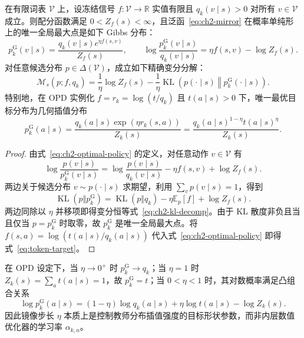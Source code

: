 \documentclass[lang=cn,scheme=chinese,openany]{elegantbook}
\begin{document}
\begin{theorem}
\label{thm:ch2-gibbs}
\label{thm:token-target}
在有限词表 $\mathcal V$ 上，设冻结信号 $f:\mathcal V\to\mathbb R$ 实值有限且 $q_k(v\mid s)>0$ 对所有 $v\in\mathcal V$ 成立。则配分函数满足 $0<Z_f(s)<\infty$，且泛函~\eqref{eq:ch2-mirror} 在概率单纯形上的唯一全局最大点是如下 Gibbs 分布：
\begin{equation}
\label{eq:ch2-optimal-policy}
 p_k^{\mathrm G}(v\mid s)=\frac{ q_k(v\mid s)e^{\eta f(s,v)}}{Z_f(s)},
\qquad
\log\frac{ p_k^{\mathrm G}(v\mid s)}{ q_k(v\mid s)}
=\eta f(s,v)-\log Z_f(s).
\end{equation}
对任意候选分布 $p\in\Delta(\mathcal V)$，成立如下精确变分分解：
\begin{equation}
\label{eq:ch2-kl-decomp,eq:variational-identity}
\mathcal M_s(p;f, q_k)
=\frac1\eta\log Z_f(s)
-\frac1\eta\operatorname{KL}\!\left(p(\cdot\mid s)\middle\Vert p_k^{\mathrm G}(\cdot\mid s)\right).
\end{equation}
特别地，在 OPD 实例化 $f=r_k=\log(t/q_k)$ 且 $t(a\mid s)>0$ 下，唯一最优目标分布为几何插值分布
\begin{equation}\label{eq:token-target}
  p_k^{\mathrm G}(a\mid s)=
 \frac{ q_k(a\mid s)\exp(\eta r_k(s,a))}{Z_k(s)}
 =\frac{ q_k(a\mid s)^{1-\eta} t(a\mid s)^\eta}{Z_k(s)}.
\end{equation}
\end{theorem}

\begin{proof}
由式~\eqref{eq:ch2-optimal-policy} 的定义，对任意动作 $v\in\mathcal V$ 有
\begin{equation*}
\log\frac{p(v\mid s)}{ p_k^{\mathrm G}(v\mid s)}
=\log\frac{p(v\mid s)}{ q_k(v\mid s)}-\eta f(s,v)+\log Z_f(s).
\end{equation*}
两边关于候选分布 $v\sim p(\cdot\mid s)$ 求期望，利用 $\sum_v p(v\mid s)=1$，得到
\begin{equation*}
\operatorname{KL}(p\Vert p_k^{\mathrm G})
=\operatorname{KL}(p\Vert q_k)-\eta\mathbb E_p[f]+\log Z_f(s).
\end{equation*}
两边同除以 $\eta$ 并移项即得变分恒等式~\eqref{eq:ch2-kl-decomp}。由于 KL 散度非负且当且仅当 $p= p_k^{\mathrm G}$ 时取零，故 $p_k^{\mathrm G}$ 是唯一全局最大点。将 $f(s,a)=\log(t(a\mid s)/q_k(a\mid s))$ 代入式~\eqref{eq:ch2-optimal-policy} 即得式~\eqref{eq:token-target}。
\end{proof}

\begin{corollary}[几何插值与步长端点极限]
在 OPD 设定下，当 $\eta\to0^+$ 时 $p_k^{\mathrm G}\to q_k$；当 $\eta=1$ 时 $Z_k(s)=\sum_a t(a\mid s)=1$，故 $p_k^{\mathrm G}= t$；当 $0<\eta<1$ 时，其对数概率满足凸组合关系
\begin{equation*}
 \log  p_k^{\mathrm G}(a\mid s)=(1-\eta)\log q_k(a\mid s)+\eta\log t(a\mid s)-\log Z_k(s).
\end{equation*}
因此镜像步长 $\eta$ 本质上是控制教师分布插值强度的目标形状参数，而非内层数值优化器的学习率 $\alpha_{k,n}$。
\end{corollary}
\end{document}
